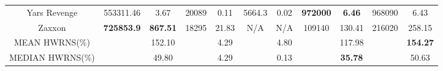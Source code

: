 \documentclass[nohyperref]{article}
\def\GDIHmeanHWRNS{154.27}
\def\GDIHmedianHWRNS{50.63}
\def\GDIImeanHWRNS{117.98}
\def\GDIImedianHWRNS{35.78}
\def\muzeromeanHWRNS{152.10}
\def\muzeromedianHWRNS{49.80}
\def\dreamermedianHWRNS{4.29}
\def\simplemeanHWRNS{4.80}
\def\simplemedianHWRNS{0.13}
\newcommand{\best}[1]{\textbf{#1}}
\theoremstyle{plain}
\begin{document}
\begin{table}[!hb]
\begin{center}
\begin{tabular}{| c |c c| c c| c c| c c| c c| }
 Yars Revenge       & 553311.46               & 3.67      & 20089             &0.11     & 5664.3            & 0.02    & \best{972000}        & \best{6.46}           &968090          &6.43\\
 Zaxxon             & \textbf{725853.9}       & \textbf{867.51}      & 18295    &21.83          & N/A      & N/A     & 109140      & 130.41                          &216020          &258.15\\
\hline
MEAN HWRNS(\%) &               &\muzeromeanHWRNS  &         &  \dreamermedianHWRNS &                                          & \simplemeanHWRNS  &     & \GDIImeanHWRNS &                  & \textbf{\GDIHmeanHWRNS} \\
\hline
MEDIAN HWRNS(\%) &            & \muzeromedianHWRNS &         &\dreamermedianHWRNS  &                                          & \simplemedianHWRNS &     & \textbf{\GDIImedianHWRNS} &                  & \GDIHmedianHWRNS \\
\hline
\end{tabular}
\end{center}
\end{table}
\clearpage
\end{document}
